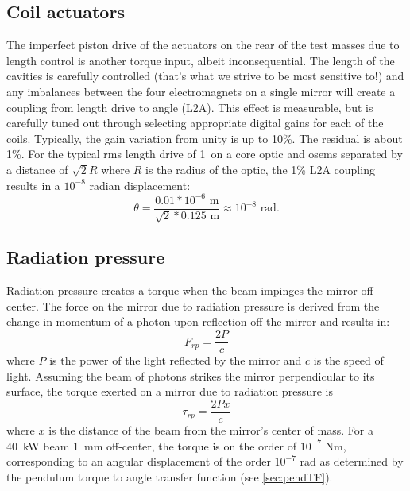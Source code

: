 \subsection{Coil actuators} 
\label{sec:L2A}
The imperfect piston drive of the actuators on the rear of the test masses due to length control is another torque input, albeit inconsequential. The length of the cavities is carefully controlled (that's what we strive to be most sensitive to!) and any imbalances between the four electromagnets on a single mirror will create a coupling from length drive to angle (L2A). This effect is measurable, but is carefully tuned out through selecting appropriate digital gains for each of the coils. Typically, the gain variation from unity is up to 10\%. The residual is about 1\%. For the typical rms length drive of 1~\micron on a core optic and osems separated by a distance of $\sqrt{2} R$ where $R$ is the radius of the optic, the 1\% L2A coupling results in a $10^{-8}$ radian displacement:
\begin{equation}
\theta = \frac{0.01 * 10^{-6} \mbox{ m}}{\sqrt{2} * 0.125 \mbox{ m}} \approx 10^{-8} \mbox{ rad}.
\end{equation}




\subsection{Radiation pressure} 
Radiation pressure creates a torque when the beam impinges the mirror
off-center. The force on the mirror due to radiation pressure is
derived from the change in momentum of a photon upon reflection off
the mirror and results in:
\begin{equation}
F_{rp} = \frac{2 P} {c}
\end{equation}
where $P$ is the power of the light reflected by the mirror and $c$ is the
speed of light. Assuming the beam of photons strikes the mirror
perpendicular to its surface, the torque exerted on a mirror due to
radiation pressure is
\begin{equation}
\tau_{rp} = \frac{2 P x} {c}
\label{eq:tau_rp}
\end{equation}
where $x$ is the distance of the beam from the mirror's center of mass. For a 40~kW beam 1~mm off-center, the torque is on the order of $10^{-7}$ Nm, corresponding to an angular displacement of the order $10^{-7}$ rad as determined by the pendulum torque to angle transfer function (see \ref{sec:pendTF}).

